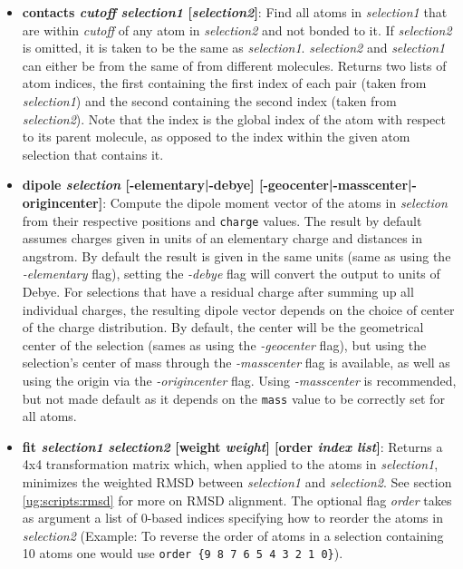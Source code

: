 \begin{itemize}
\item {\bf contacts {\it cutoff} {\it selection1} [{\it selection2}]}:
  Find all atoms in {\it selection1} that are within {\it cutoff} of 
  any atom in {\it selection2} and not bonded to it.  If {\it selection2} is 
  omitted, it is taken to be the same as {\it selection1}.  {\it selection2} 
  and {\it selection1} can either be from the same of from different molecules.
  Returns two lists of atom indices, the first containing the first index of 
  each pair (taken from {\it selection1}) and the 
  second containing the second index (taken from {\it selection2}).  
  Note that the index is the global index of the atom with respect to its 
  parent molecule, as opposed to the index within the given atom 
  selection that contains it.  

\item {\bf dipole {\it selection} [-elementary|-debye] [-geocenter|-masscenter|-origincenter]}:
  Compute the dipole moment vector of the atoms in {\it selection} from
  their respective positions and {\tt charge} values. The result by
  default assumes charges given in units of an elementary charge
  and distances in angstrom. By default the result is given in the 
  same units (same as using the {\it -elementary} flag), setting the 
  {\it -debye} flag will convert the output to units of Debye.
  For selections that have a residual charge after summing up all
  individual charges, the resulting dipole vector depends on the 
  choice of center of the charge distribution. By default, the center 
  will be the geometrical center of the selection (sames as using 
  the {\it -geocenter} flag), but using the selection's center of mass 
  through the {\it -masscenter} flag is available, as well as
  using the origin via the {\it -origincenter} flag. Using {\it -masscenter}
  is recommended, but not made default as it depends on the
  {\tt mass} value to be correctly set for all atoms.

\item {\bf fit {\it selection1} {\it selection2} [weight {\it weight}] [order {\it index list}]}:
  Returns a 4x4 transformation matrix which, when applied to the atoms in
  {\it selection1}, minimizes the weighted RMSD between {\it selection1} and
  {\it selection2}.  See section \ref{ug:scripts:rmsd} for more on RMSD 
  alignment. The optional flag {\it order} takes as argument a list of
  0-based indices specifying how to reorder the atoms in {\it selection2}
  (Example: To reverse the order of atoms in a selection containing 10 atoms
  one would use {\tt order \{9 8 7 6 5 4 3 2 1 0\}}). 
  


\end{itemize}
